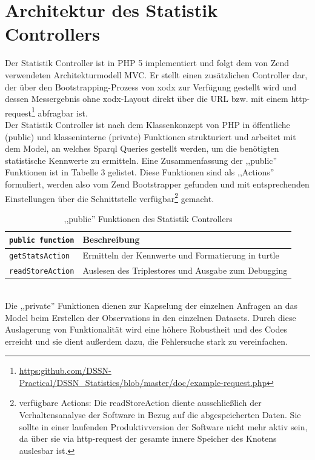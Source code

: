 \documentclass{article}
\begin{document}
\section{Architektur des Statistik Controllers}
Der Statistik Controller ist in PHP 5 implementiert und folgt dem von Zend verwendeten Architekturmodell MVC. Er stellt einen zusätzlichen Controller dar, der über den Bootstrapping-Prozess von xodx zur Verfügung gestellt wird und dessen Messergebnis ohne xodx-Layout direkt über die URL bzw. mit einem http-request\footnote{\url{https:github.com/DSSN-Practical/DSSN\_Statistics/blob/master/doc/example-request.php}} abfragbar ist.\\
Der Statistik Controller ist nach dem Klassenkonzept von PHP in öffentliche (public) und klasseninterne (private) Funktionen strukturiert und arbeitet mit dem Model, an welches Sparql Queries gestellt werden, um die benötigten statistische Kennwerte zu ermitteln. Eine Zusammenfassung der ,,public'' Funktionen ist in Tabelle 3 gelistet. \newpage
Diese Funktionen sind als ,,Actions'' formuliert, werden also vom Zend Bootstrapper gefunden und mit entsprechenden Einstellungen über die Schnittstelle verfügbar\footnote{verfügbare Actions: Die readStoreAction diente ausschließlich der Verhaltensanalyse der Software in Bezug auf die abgespeicherten Daten. Sie sollte in einer laufenden Produktivversion der Software nicht mehr aktiv sein, da über sie via http-request der gesamte innere Speicher des Knotens auslesbar ist.} gemacht.\\
\begin{table}[h!]
\centering
\label{table3}
\begin{tabular}{|l|l|}
\hline
\texttt{public function} & Beschreibung \\ \hline
\texttt{getStatsAction}       & Ermitteln der Kennwerte und Formatierung in turtle 	\\ \hline
\texttt{readStoreAction}      & Auslesen des Triplestores und Ausgabe zum Debugging	\\ \hline
\end{tabular}
\caption{,,public'' Funktionen des Statistik Controllers}
\end{table}\\
Die ,,private'' Funktionen dienen zur Kapselung der einzelnen Anfragen an das Model beim Erstellen der Observations in den einzelnen Datasets. Durch diese Auslagerung von Funktionalität wird eine höhere Robustheit und des Codes erreicht und sie dient außerdem dazu, die Fehlersuche stark zu vereinfachen.
\end{document}
